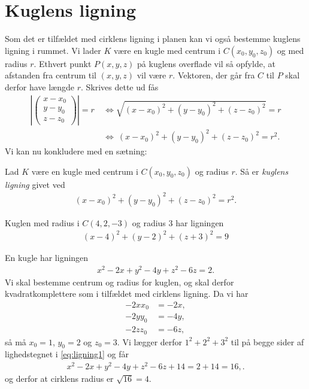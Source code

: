 \section*{Kuglens ligning}
Som det er tilfældet med cirklens ligning i planen kan vi også bestemme kuglens ligning i rummet. Vi lader $K$ være en kugle med centrum i $C(x_0,y_0,z_0)$ og med radius $r$. Ethvert punkt $P(x,y,z)$ på kuglens overflade vil så opfylde, at afstanden fra centrum til $(x,y,z)$ vil være $r$. Vektoren, der går fra $C$ til $P$ skal derfor have længde $r$. Skrives dette ud fås
\begin{align*}
	\left|
	\begin{pmatrix}
		x-x_0 \\ y-y_0 \\ z-z_0
	\end{pmatrix}
	\right| = r \ &\Leftrightarrow 
	\sqrt{(x-x_0)^2+(y-y_0)^2+(z-z_0)^2} = r \\\ &\Leftrightarrow \ (x-x_0)^2+(y-y_0)^2+(z-z_0)^2 = r^2.
\end{align*} 
Vi kan nu konkludere med en sætning:
\begin{setn}
	Lad $K$ være en kugle med centrum i $C(x_0,y_0,z_0)$ og radius $r$. Så er \textit{kuglens ligning} givet ved
	\begin{align*}
		(x-x_0)^2 + (y-y_0)^2 + (z-z_0)^2 = r^2.
	\end{align*}
\end{setn}

\begin{exa}
	Kuglen med radius i $C(4,2,-3)$ og radius $3$ har ligningen
	\begin{align*}
		(x-4)^2 + (y-2)^2 + (z+3)^2 = 9
	\end{align*}
\end{exa}

\begin{exa}
	En kugle har ligningen 
	\begin{align}\label{eq:ligning1}
		x^2-2x+y^2-4y+z^2-6z = 2.
	\end{align}
	Vi skal bestemme centrum og radius for kuglen, og skal derfor kvadratkomplettere som i tilfældet med cirklens ligning. Da vi har 
	\begin{align*}
		-2xx_0 &= -2x, \\
		-2yy_0 &= -4y, \\
		-2zz_0 &= -6z,
	\end{align*}
	så må $x_0=1$, $y_0 = 2$ og $z_0 = 3$. Vi lægger derfor $1^2+2^2+3^2$ til på begge sider af lighedstegnet i \eqref{eq:ligning1} og får
	\begin{align*}
		x^2-2x+y^2-4y+z^2-6z+14 = 2+14 = 16, .
	\end{align*}
	og derfor at cirklens radius er $\sqrt{16}=4$.
\end{exa}


